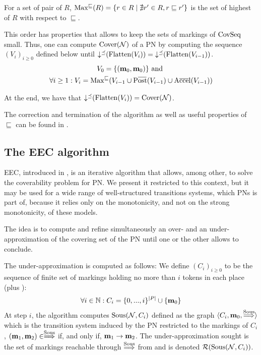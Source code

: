 For a set of pair of \omarks $R$, $\operatorname{Max^\sqsubseteq}(R) = \{ r \in R \mid \nexists r' \in R, r \sqsubseteq r'\}$ is the set of highest \omark of $R$ with respect to $\sqsubseteq$.

This order has properties \citep{Geeraerts07} that allows to keep the sets of markings of $\operatorname{CovSeq}$ small.
Thus, one can compute $\operatorname{Cover}(\mathcal{N})$ of a \ac{PN} \NPTm by computing the sequence $(V_i)_{i \geq 0}$ defined below until $\operatorname{\downarrow^\preceq}(\operatorname{Flatten}(V_i)) = \operatorname{\downarrow^\preceq}(\operatorname{Flatten}(V_{i-1}))$.
\begin{gather*}
  V_0 = \{(\mari, \mari)\} \text{ and } \\
  \forall i \geq 1 : V_i = \Maxs(V_{i-1} \cup \Postb(V_{i-1}) \cup \Accelb(V_{i-1}))
\end{gather*}

At the end, we have that $\operatorname{\downarrow^\preceq}(\operatorname{Flatten}(V_i)) = \operatorname{Cover}(\mathcal{N})$.

The correction and termination of the algorithm as well as useful properties of $\sqsubseteq$ can be found in \cite{Geeraerts07, Ganty09}.

\subsection{The \ac{EEC} algorithm}
\label{sec:eec}

\ac{EEC}, introduced in \cite{Geeraerts07thesis, Geeraerts06}, is an iterative algorithm that allows, among other, to solve the coverability problem for \ac{PN}.
We present it restricted to this context, but it may be used for a wide range of well-structured transitions systems, which \acp{PN} is part of, because it relies only on the monotonicity, and not on the strong monotonicity, of these models.

The idea is to compute and refine simultaneously an over- and an under-approximation of the covering set of the \ac{PN} until one or the other allows to conclude.

The under-approximation is computed as follows:
We define $(C_i)_{i \geq 0}$ to be the sequence of finite set of markings holding no more than $i$ tokens in each place (plus \mari):
\[
  \forall i \in \mathbb{N} : C_i = \{0, ..., i\}^{|P|} \cup \{\mathbf{m}_0\}
\]
At step $i$, the algorithm computes $\operatorname{Sous}(\mathcal{N}, C_i)$ defined as the graph $\langle C_i, \mathbf{m}_0, \stackrel{\operatorname{Sous}}{\Longrightarrow} \rangle$ which is the transition system induced by the \ac{PN} \N restricted to the markings of $C_i$,  $(\mathbf{m}_1, \mathbf{m}_2) \in \stackrel{\operatorname{Sous}}{\Longrightarrow}$ if, and only if, $\mathbf{m}_1 \rightarrow \mathbf{m}_2$.
The under-approximation sought is the set of markings reachable through $\stackrel{\operatorname{Sous}}{\Longrightarrow}$ from \mari and is denoted $\operatorname{\mathcal{R}}(\operatorname{Sous}(\mathcal{N}, C_i))$.

